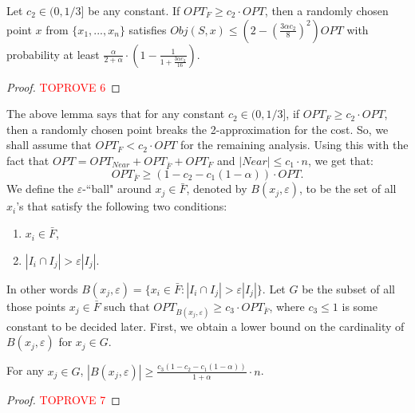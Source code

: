 \documentclass[11pt]{llncs}
\newcommand{\veps}{\varepsilon}
\begin{document}
\begin{lemma}\label{lemma:2}
Let $c_2 \in (0, 1/3]$ be any constant.
If $OPT_{F} \geq c_2 \cdot OPT$, then a randomly chosen point $x$ from $\{x_1, ..., x_n\}$ satisfies $Obj(S, x) \leq \left(2 - \left(\frac{3\alpha c_2}{8}\right)^2 \right)OPT$ with probability at least $\frac{\alpha}{2 + \alpha} \cdot \left(1 - \frac{1}{1 + \frac{3\alpha c_2}{16}} \right)$.
\end{lemma}
\begin{proof}\textcolor{red}{TOPROVE 6}\end{proof}





















The above lemma says that for any constant $c_2 \in (0, 1/3]$, if $OPT_F \geq c_2 \cdot OPT$, then a randomly chosen point breaks the 2-approximation for the cost. 
So, we shall assume that $OPT_F < c_2 \cdot OPT$ for the remaining analysis. Using this with the fact that $OPT = OPT_{Near} + OPT_{\bar{F}} + OPT_F$ and $|Near| \leq c_1 \cdot n$, we get that:
\begin{equation}\label{eqn:1}
OPT_{\bar{F}} \geq (1 - c_2 - c_1(1-\alpha)) \cdot OPT.
\end{equation}
We define the $\veps$-``ball" around $x_j \in \bar{F}$, denoted by $B(x_j, \veps)$, to be the set of all $x_i$'s that satisfy the following two conditions:
\begin{enumerate}
\item $x_i \in \bar{F}$,
\item $|I_i \cap I_j| > \veps |I_j|$.
\end{enumerate}




In other words $B(x_j, \veps) = \{x_i \in \bar{F} : |I_i \cap I_j| > \veps |I_j|\}$.
Let $G$ be the subset of all those points $x_j \in \bar{F}$ such that $OPT_{B(x_j, \veps)} \geq c_3 \cdot OPT_{\bar{F}}$, where $c_3 \leq 1$ is some constant to be decided later.  
First, we obtain a lower bound on the cardinality of $B(x_j, \veps)$ for $x_j \in G$.

\begin{lemma}\label{lemma:3}
For any $x_j \in G$, $|B(x_j, \veps)| \geq \frac{c_3(1 - c_2 - c_1(1-\alpha))}{1+\alpha} \cdot n$.
\end{lemma}
\begin{proof}\textcolor{red}{TOPROVE 7}\end{proof}
\end{document}
